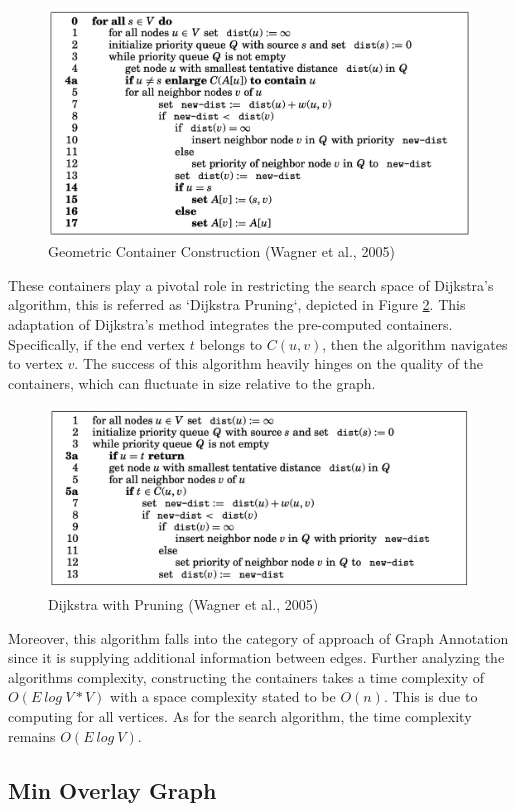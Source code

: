 \documentclass{article}
\begin{document}
\begin{figure}
    \centering
    \includegraphics[width=0.7\linewidth]{img/container.png}
    \caption{Geometric Container Construction (Wagner et al., 2005)}
    \label{fig:geoconstruct}
\end{figure}

These containers play a pivotal role in restricting the search space of Dijkstra's algorithm, this is referred as `Dijkstra Pruning`, depicted in Figure \ref{fig:geodijkstra}. This adaptation of Dijkstra's method integrates the pre-computed containers. Specifically, if the end vertex \(t\) belongs to \(C(u,v)\), then the algorithm navigates to vertex \(v\). The success of this algorithm heavily hinges on the quality of the containers, which can fluctuate in size relative to the graph.

\begin{figure}
    \centering
    \includegraphics[width=0.7\linewidth]{img/pruning.png}
    \caption{Dijkstra with Pruning (Wagner et al., 2005)}
    \label{fig:geodijkstra}
\end{figure}

Moreover, this algorithm falls into the category of approach of Graph Annotation since it is supplying additional information between edges. Further analyzing the algorithms complexity, constructing the containers takes a time complexity of $O(E \ log \ V * V)$ with a space complexity stated to be $O(n)$. This is due to computing for all vertices. As for the search algorithm, the time complexity remains $O(E \ log \ V)$.

\subsection{Min Overlay Graph}
\end{document}
